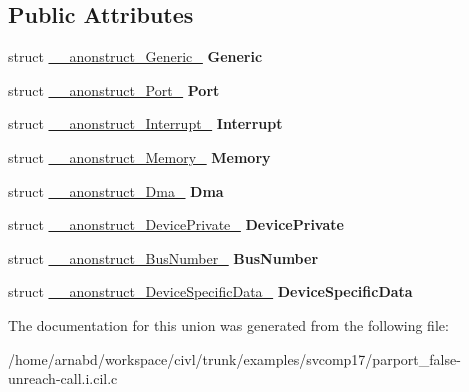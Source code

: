 \subsection*{Public Attributes}
\begin{DoxyCompactItemize}
\item 
\hypertarget{union____anonunion__u__15_aef4d4ba439f49f7f60056f9667983f60}{}struct \hyperlink{struct____anonstruct__Generic__16}{\+\_\+\+\_\+anonstruct\+\_\+\+Generic\+\_} {\bfseries Generic}\label{union____anonunion__u__15_aef4d4ba439f49f7f60056f9667983f60}

\item 
\hypertarget{union____anonunion__u__15_ad481b16f0ad47a72d0b36ee0c20981c1}{}struct \hyperlink{struct____anonstruct__Port__17}{\+\_\+\+\_\+anonstruct\+\_\+\+Port\+\_} {\bfseries Port}\label{union____anonunion__u__15_ad481b16f0ad47a72d0b36ee0c20981c1}

\item 
\hypertarget{union____anonunion__u__15_a7d35ee1ee3cb908c8e2212256d8801c5}{}struct \hyperlink{struct____anonstruct__Interrupt__18}{\+\_\+\+\_\+anonstruct\+\_\+\+Interrupt\+\_} {\bfseries Interrupt}\label{union____anonunion__u__15_a7d35ee1ee3cb908c8e2212256d8801c5}

\item 
\hypertarget{union____anonunion__u__15_a351d08a8b3a1665c8607f8da67d1d13f}{}struct \hyperlink{struct____anonstruct__Memory__19}{\+\_\+\+\_\+anonstruct\+\_\+\+Memory\+\_} {\bfseries Memory}\label{union____anonunion__u__15_a351d08a8b3a1665c8607f8da67d1d13f}

\item 
\hypertarget{union____anonunion__u__15_a6f48100b049d5ff07b06a81c20724d78}{}struct \hyperlink{struct____anonstruct__Dma__20}{\+\_\+\+\_\+anonstruct\+\_\+\+Dma\+\_} {\bfseries Dma}\label{union____anonunion__u__15_a6f48100b049d5ff07b06a81c20724d78}

\item 
\hypertarget{union____anonunion__u__15_a29c3f529c85c0beda1e590ce6a1b7f2a}{}struct \hyperlink{struct____anonstruct__DevicePrivate__21}{\+\_\+\+\_\+anonstruct\+\_\+\+Device\+Private\+\_} {\bfseries Device\+Private}\label{union____anonunion__u__15_a29c3f529c85c0beda1e590ce6a1b7f2a}

\item 
\hypertarget{union____anonunion__u__15_a5af660ed70280d583e4163dac5c28493}{}struct \hyperlink{struct____anonstruct__BusNumber__22}{\+\_\+\+\_\+anonstruct\+\_\+\+Bus\+Number\+\_} {\bfseries Bus\+Number}\label{union____anonunion__u__15_a5af660ed70280d583e4163dac5c28493}

\item 
\hypertarget{union____anonunion__u__15_a521e545a77feff063dd60484b7da7dd9}{}struct \hyperlink{struct____anonstruct__DeviceSpecificData__23}{\+\_\+\+\_\+anonstruct\+\_\+\+Device\+Specific\+Data\+\_} {\bfseries Device\+Specific\+Data}\label{union____anonunion__u__15_a521e545a77feff063dd60484b7da7dd9}

\end{DoxyCompactItemize}


The documentation for this union was generated from the following file\+:\begin{DoxyCompactItemize}
\item 
/home/arnabd/workspace/civl/trunk/examples/svcomp17/parport\+\_\+false-\/unreach-\/call.\+i.\+cil.\+c\end{DoxyCompactItemize}
